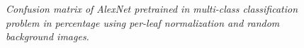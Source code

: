 \begin{figure}[t]
	\begin{center}
	\end{center}
	\caption{\textit{Confusion matrix of AlexNet pretrained in multi-class classification problem in percentage using per-leaf normalization and random background images.}}
	\label{fig:conf_matrix}
	\label{fig:long}
	\label{fig:onecol}
	\vspace{-5pt}
\end{figure}
